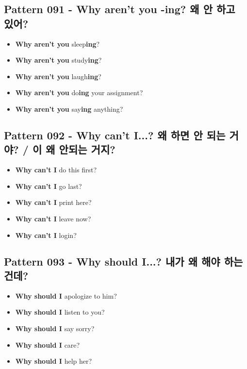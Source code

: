 \documentclass[11pt]{oblivoir}
\begin{document}
\subsection{Pattern 091 - Why aren't you -ing? 왜 \texttildelow 안 하고 있어?}
\begin{itemize}
  \item \textbf{Why aren't you} sleep\textbf{ing}?
  \item \textbf{Why aren't you} study\textbf{ing}?
  \item \textbf{Why aren't you} laugh\textbf{ing}?
  \item \textbf{Why aren't you} do\textbf{ing} your assignment?
  \item \textbf{Why aren't you} say\textbf{ing} anything?
\end{itemize}

\subsection{Pattern 092 - Why can't I...? 왜 \texttildelow 하면 안 되는 거야? / \texttildelow 이 왜 안되는 거지?}
\begin{itemize}
  \item \textbf{Why can't I} do this first?
  \item \textbf{Why can't I} go last?
  \item \textbf{Why can't I} print here?
  \item \textbf{Why can't I} leave now?
  \item \textbf{Why can't I} login?
\end{itemize}

\subsection{Pattern 093 - Why should I...? 내가 왜 \texttildelow 해야 하는 건데?}
\begin{itemize}
  \item \textbf{Why should I} apologize to him?
  \item \textbf{Why should I} listen to you?
  \item \textbf{Why should I} say sorry?
  \item \textbf{Why should I} care?
  \item \textbf{Why should I} help her?
\end{itemize}
\end{document}

